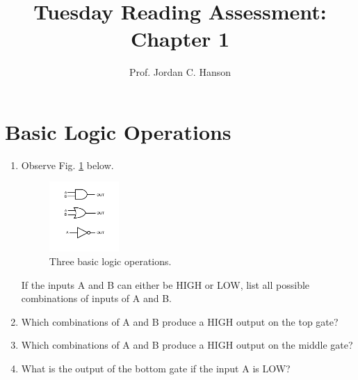 \documentclass{article}
\begin{document}
\title{Tuesday Reading Assessment: Chapter 1}
\author{Prof. Jordan C. Hanson}

\maketitle

\section{Basic Logic Operations}

\begin{enumerate}
\item Observe Fig. \ref{fig:oper1} below.  
\begin{figure}[ht]
\centering
\includegraphics[width=0.25\textwidth]{Operators3.pdf}
\caption{\label{fig:oper1} Three basic logic operations.}
\end{figure}
If the inputs A and B can either be HIGH or LOW, list all possible combinations of inputs of A and B. \\ \vspace{1cm}
\item Which combinations of A and B produce a HIGH output on the top gate? \\ \vspace{1cm}
\item Which combinations of A and B produce a HIGH output on the middle gate? \\ \vspace{1cm}
\item What is the output of the bottom gate if the input A is LOW?
\end{enumerate}
\end{document}
